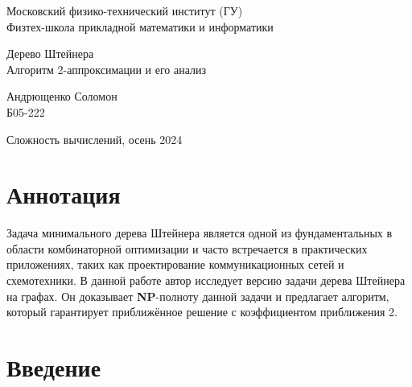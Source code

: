 \documentclass[a4paper,12pt]{article}
\begin{document}
    \begin{center}
        {\large Московский физико-технический институт (ГУ)} \\
        {\large Физтех-школа прикладной математики и информатики}
    \end{center}
    
    \vspace{8cm}
    
    \begin{center}
        {\Huge Дерево Штейнера} \\[0.3cm]
        {\Large Алгоритм 2-аппроксимации и его анализ}
    \end{center}
    
    \vspace{3cm}
    
    \begin{flushright}
        {\large Андрющенко Соломон} \\
        {\large Б05-222}
    \end{flushright}
    
    \vfill
    
    \begin{center}
        Сложность вычислений, осень 2024
    \end{center}


    \newpage
    
    \section*{Аннотация}
    Задача минимального дерева Штейнера является одной из фундаментальных в области комбинаторной оптимизации и часто встречается в практических приложениях, таких как проектирование коммуникационных сетей и схемотехники. В данной работе автор исследует версию задачи дерева Штейнера на графах. Он доказывает \textbf{NP}-полноту данной задачи и предлагает алгоритм, который гарантирует приближённое решение с коэффициентом приближения 2.
    
    \vspace{1cm}
    
    \tableofcontents
    
    \newpage
    
    \section{Введение}
\end{document}
